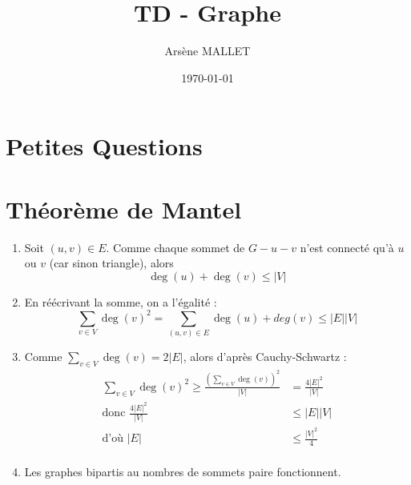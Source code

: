 \documentclass{article}
\title{TD - Graphe}
\date{\today}
\author{Arsène MALLET}
\begin{document}
\thispagestyle{firstpage}

\begin{center}
    \huge\bfseries{\@title}
\end{center}

\section{Petites Questions}

\section{Théorème de Mantel}

\begin{enumerate}
    \item Soit $(u, v) \in E$. Comme chaque sommet de $G - u - v$ n'est connecté qu'à $u$ ou $v$ (car sinon triangle), alors $$\deg(u) + \deg(v) \leq |V|$$
    \item En réécrivant la somme, on a l'égalité : $$ \sum_{v \in V} \deg(v)^2 = \sum_{(u, v) \in E} \deg(u) + deg(v) \leq |E||V| $$
    \item Comme $\sum_{v \in V} \deg(v) = 2|E|$, alors d'après Cauchy-Schwartz : 
    \begin{align*}
        \sum_{v \in V} \deg(v)^2 \geq \frac{(\sum_{v \in V} \deg(v) )^2}{|V|} & = \frac{4|E|^2}{|V|} \\
        \text{donc } \frac{4|E|^2}{|V|} & \leq |E||V| \\
        \text{d'où } |E| & \leq \frac{|V|^2}{4} \\
    \end{align*}
    \item Les graphes bipartis au nombres de sommets paire fonctionnent.
\end{enumerate}
\end{document}
